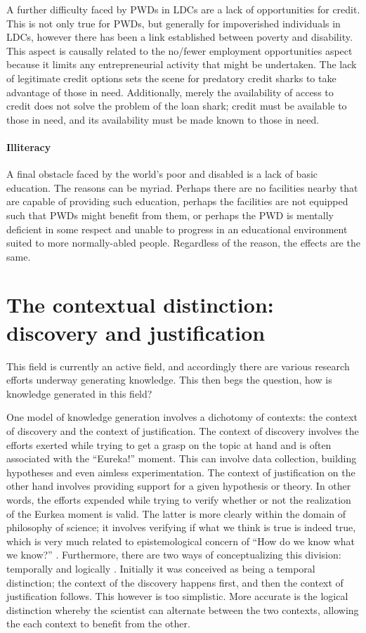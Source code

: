 \documentclass[a4paper]{article}
\begin{document}
A further difficulty faced by PWDs in LDCs are a lack of opportunities for
credit. This is not only true for PWDs, but generally for impoverished
individuals in LDCs, however there has been a link established between poverty
and disability. This aspect is causally related to the no/fewer employment
opportunities aspect because it limits any entrepreneurial activity that might
be undertaken. The lack of legitimate credit options sets the scene for
predatory credit sharks to take advantage of those in need. Additionally,
merely the availability of access to credit does not solve the problem of the
loan shark; credit must be available to those in need, and its availability
must be made known to those in need.


\paragraph{Illiteracy}

A final obstacle faced by the world’s poor and disabled is a lack of basic
education. The reasons can be myriad. Perhaps there are no facilities nearby
that are capable of providing such education, perhaps the facilities are not
equipped such that PWDs might benefit from them, or perhaps the PWD is
mentally deficient in some respect and unable to progress in an educational
environment suited to more normally-abled people. Regardless of the reason,
the effects are the same.

\newpage
\section{The contextual distinction: discovery and justification}

This field is currently an active field, and accordingly there are various
research efforts underway generating knowledge. This then begs the question,
how is knowledge generated in this field?  


One model of knowledge generation involves a dichotomy of contexts: the
context of discovery and the context of justification. The context of
discovery involves the efforts exerted while trying to get a grasp on the
topic at hand and is often associated with the ``Eureka!'' moment. This can
involve data collection, building hypotheses and even aimless experimentation.
The context of justification on the other hand involves providing support for
a given hypothesis or theory. In other words, the efforts expended while
trying to verify whether or not the realization of the Eurkea moment is valid.
The latter is more clearly within the domain of philosophy of science; it
involves verifying if what we think is true is indeed true, which is very much
related to epistemological concern of ``How do we know what we know?''
\citep{schickore2014scientific}. Furthermore, there are two ways of
conceptualizing this division: temporally and logically
\citep{schickore2006introduction}.  Initially it was conceived as being a
temporal distinction; the context of the discovery happens first, and then the
context of justification follows. This however is too simplistic.  More
accurate is the logical distinction whereby the scientist can alternate
between the two contexts, allowing the each context to benefit from the other.
\end{document}
